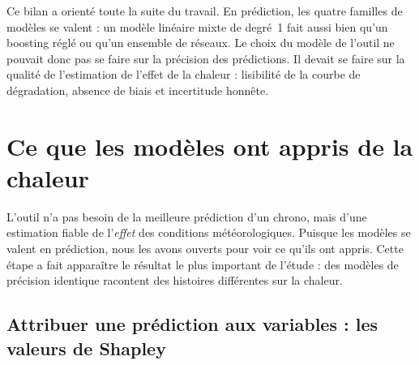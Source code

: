 \documentclass[11pt,a4paper]{article}
\begin{document}
Ce bilan a orienté toute la suite du travail. En prédiction, les quatre familles de modèles se valent : un modèle
linéaire mixte de degré~1 fait aussi bien qu'un boosting réglé ou qu'un ensemble de réseaux. Le choix du modèle de
l'outil ne pouvait donc pas se faire sur la précision des prédictions. Il devait se faire sur la qualité de
l'estimation de l'effet de la chaleur : lisibilité de la courbe de dégradation, absence de biais et incertitude
honnête.

\section{Ce que les modèles ont appris de la chaleur}\label{sec:interpretation}

L'outil n'a pas besoin de la meilleure prédiction d'un chrono, mais d'une estimation fiable de l'\emph{effet} des
conditions météorologiques. Puisque les modèles se valent en prédiction, nous les avons ouverts pour voir ce qu'ils
ont appris. Cette étape a fait apparaître le résultat le plus important de l'étude : des modèles de précision
identique racontent des histoires différentes sur la chaleur.

\subsection{Attribuer une prédiction aux variables : les valeurs de Shapley}\label{sec:shap}
\end{document}
